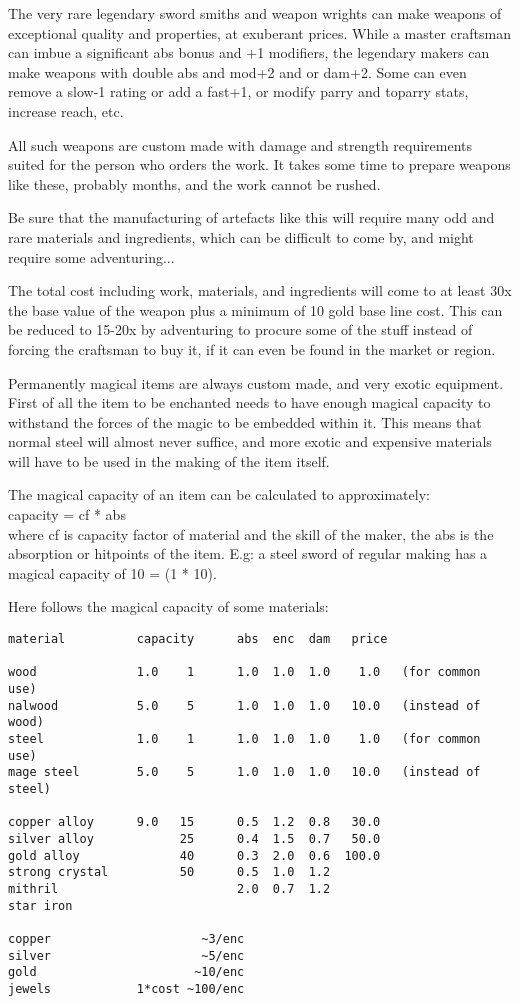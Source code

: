 The very rare legendary sword smiths and weapon wrights can make weapons of exceptional quality and properties, at exuberant prices. While a master craftsman can imbue a significant abs bonus and +1 modifiers, the legendary makers can make weapons with double abs and mod+2 and or dam+2. Some can even remove a slow-1 rating or add a fast+1, or modify parry and toparry stats, increase reach, etc.

All such weapons are custom made with damage and strength requirements suited for the person who orders the work. It takes some time to prepare weapons like these, probably months, and the work cannot be rushed.

Be sure that the manufacturing of artefacts like this will require many odd and rare materials and ingredients, which can be difficult to come by, and might require some adventuring...

The total cost including work, materials, and ingredients will come to at least 30x the base value of the weapon plus a minimum of 10 gold base line cost. This can be reduced to 15-20x by adventuring to procure some of the stuff instead of forcing the craftsman to buy it, if it can even be found in the market or region.


Permanently magical items are always custom made, and very exotic equipment.
First of all the item to be enchanted needs to have enough magical capacity to withstand the forces of the magic to be embedded within it. This means that normal steel will almost never suffice, and more exotic and expensive materials will have to be used in the making of the item itself.

The magical capacity of an item can be calculated to approximately: \\
capacity = cf * abs \\
where cf is capacity factor of material and the skill of the maker, the abs is the absorption or hitpoints of the item.
E.g: a steel sword of regular making has a magical capacity of 10 = (1 * 10).

Here follows the magical capacity of some materials:

\small \begin{verbatim}
material          capacity      abs  enc  dam   price

wood              1.0    1      1.0  1.0  1.0    1.0   (for common use)
nalwood           5.0    5      1.0  1.0  1.0   10.0   (instead of wood)
steel             1.0    1      1.0  1.0  1.0    1.0   (for common use)
mage steel        5.0    5      1.0  1.0  1.0   10.0   (instead of steel)

copper alloy      9.0   15      0.5  1.2  0.8   30.0
silver alloy            25      0.4  1.5  0.7   50.0
gold alloy              40      0.3  2.0  0.6  100.0
strong crystal          50      0.5  1.0  1.2
mithril                         2.0  0.7  1.2
star iron

copper                     ~3/enc
silver                     ~5/enc
gold                      ~10/enc
jewels            1*cost ~100/enc

\end{verbatim} \normalsize

